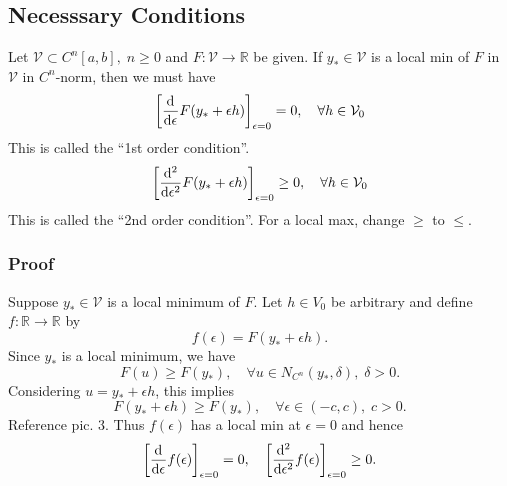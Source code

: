 \documentclass[12pt,twoside]{article}
\begin{document}
\subsection{Necesssary Conditions}
Let $\mathcal{V}\subset C^n[a,b],\; n\ge0$ and
$F:\mathcal{V}\rightarrow\mathbb{R}$ be given. If $y_*\in\mathcal{V}$ is a local
min of $F$ in $\mathcal{V}$ in $C^n$-norm, then we must have
\begin{equation*}
  \left[\od{}{\epsilon}F(y_*+\epsilon h)\right]_{\epsilon=0}=0,\quad \forall h\in\mathcal{V}_0
\end{equation*}
This is called the ``1st order condition''.
\begin{equation*}
  \left[\od[2]{}{\epsilon}F(y_*+\epsilon h)\right]_{\epsilon=0}\ge0,\quad \forall h\in\mathcal{V}_0
\end{equation*}
This is called the ``2nd order condition''. For a local max, change $\ge$ to $\le$.

\subsubsection{Proof}
Suppose $y_*\in\mathcal{V}$ is a local minimum of $F$. Let $h\in V_0$ be
arbitrary and define $f:\mathbb{R}\rightarrow\mathbb{R}$ by
$$f(\epsilon) = F(y_*+\epsilon h).$$
Since $y_*$ is a local minimum, we have
$$F(u)\ge F(y_*),\quad \forall u\in N_{C^n}(y_*,\delta),\;\delta>0.$$
Considering $u=y_*+\epsilon h$, this implies
$$F(y_*+\epsilon h)\ge F(y_*),\quad \forall \epsilon\in(-c,c),\; c>0.$$
Reference pic. 3. Thus $f(\epsilon)$ has a local min at $\epsilon=0$ and hence
\begin{equation*}
  \left[ \od{}{\epsilon}f(\epsilon) \right]_{\epsilon=0}=0,\quad
  \left[ \od[2]{}{\epsilon} f(\epsilon) \right]_{\epsilon=0}\ge0.
\end{equation*}
\end{document}
